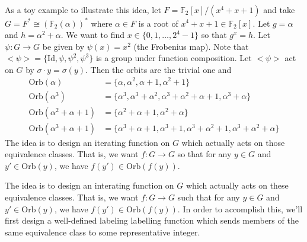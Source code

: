 \documentclass{article}
\newcommand{\FF}{\mathbb{F}}
\newcommand{\isom}{\cong}
\newcommand{\Orb}{\mathrm{Orb}}
\begin{document}
\iffalse
As a toy example to illustrate this idea, let $F=\FF_2[x]/(x^4+x+1)$ and take $G=F^* \isom (\FF_2(\alpha))^*$ where $\alpha \in F$ is a root of $x^4+x+1 \in \FF_2[x]$. Let $g=\alpha$ and $h=\alpha^2+\alpha$. We want to find $x \in \{0,1,\ldots,2^4-1\}$ so that $g^x=h$. Let $\psi : G \to G$ be given by $\psi(x)=x^2$ (the Frobenius map). Note that $<\psi> = \{\mathrm{Id}, \psi, \psi^2, \psi^3\}$ is a group under function composition. Let $<\psi>$ act on $G$ by $\sigma \cdot y = \sigma(y)$. Then the orbits are the trivial one and
\begin{align*}
	\Orb(\alpha) &= \{\alpha,\alpha^2,\alpha+1,\alpha^2+1\} \\
	\Orb(\alpha^3) &= \{\alpha^3, \alpha^3+\alpha^2, \alpha^3+\alpha^2+\alpha+1, \alpha^3+\alpha\} \\
	\Orb(\alpha^2+\alpha+1) &= \{\alpha^2+\alpha+1,\alpha^2+\alpha\} \\
	\Orb(\alpha^3+\alpha+1) &= \{\alpha^3+\alpha+1,\alpha^3+1,\alpha^3+\alpha^2+1,\alpha^3+\alpha^2+\alpha\}
\end{align*}
The idea is to design an iterating function on $G$ which actually acts on those equivalence classes. That is, we want $f: G \to G$ so that for any $y \in G$ and $y' \in \Orb(y)$, we have $f(y') \in \Orb(f(y))$.


The idea is to design an interating function on $G$ which actually acts on these equivalence classes. That is, we want $f: G \to G$ such that for any $y \in G$ and $y' \in \Orb(y)$, we have $f(y') \in \Orb(f(y))$. In order to accomplish this, we'll first design a well-defined labeling labelling function which sends members of the same equivalence class to some representative integer.
\end{document}

